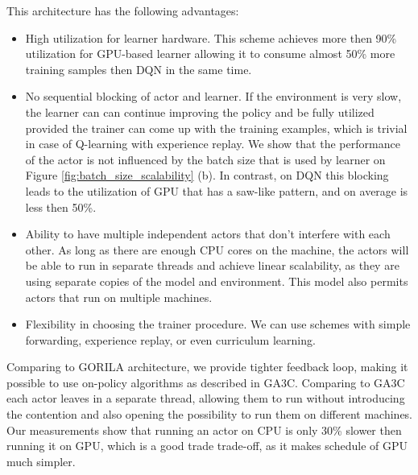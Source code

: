 This architecture has the following advantages:
\begin{itemize}
    \item High utilization for learner hardware. This scheme achieves more then 90\% utilization
        for GPU-based learner allowing it to consume almost 50\% more training samples then DQN in
        the same time.

    \item No sequential blocking of actor and learner. If the environment is very slow, the learner
        can can continue improving the policy and be fully utilized provided the trainer can come up
        with the training examples, which is trivial in case of Q-learning with experience replay.
        We show that the performance of the actor is not influenced by the batch size that is
        used by learner on Figure \ref{fig:batch_size_scalability} (b).
        In contrast, on DQN this blocking leads to the utilization of GPU that has a saw-like
        pattern, and on average is less then 50\%.

    \item Ability to have multiple independent actors that don't interfere with each other. As long
        as there are enough CPU cores on the machine, the actors will be able to run in separate
        threads and achieve linear scalability, as they are using separate copies of the model and
        environment. This model also permits actors that run on multiple machines.

    \item Flexibility in choosing the trainer procedure. We can use schemes with simple forwarding,
        experience replay, or even curriculum learning.
\end{itemize}

Comparing to GORILA architecture, we provide tighter feedback loop, making it possible to use
on-policy algorithms as described in GA3C. Comparing to GA3C each actor leaves in a separate
thread, allowing them to run without introducing the contention and also opening the possibility
to run them on different machines. Our measurements show that running an actor on CPU is only 30\%
slower then running it on GPU, which is a good trade trade-off, as it makes schedule of GPU much
simpler.

\begin{figure*}[!t]
\\
\caption{Dependence of core system parameters on batch size used by learner. Bigger
batch sizes lead to higher training throughput, and don't influence actors}
\label{fig:batch_size_scalability}
\end{figure*}

